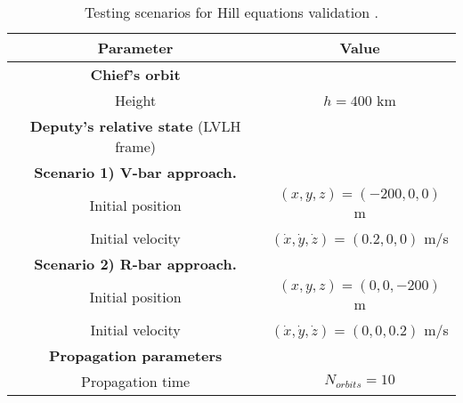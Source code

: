 \begin{table}[!htb]
\begin{center}
\begin{tabular}{|c|c|}
\hline 
\hline
\rowcolor{Gray!30}
\textbf{Parameter} & \textbf{Value} \\
\hline 
\hline 
\rowcolor{Gray!10} \textbf{Chief's orbit} &   \\
\hline
 Height & $h = 400$ km \\
\hline 
\rowcolor{Gray!10}\textbf{Deputy's relative state} (LVLH frame) &   \\
\hline
\textbf{Scenario 1) V-bar approach. } &   \\
 Initial position & $( x, y, z) = (-200, 0, 0)$ m \\
 Initial velocity & $(  \dot{x}, \dot{y}, \dot{z})= (0.2, 0, 0)$ m/s \\  
\hline 
\textbf{Scenario 2) R-bar approach. } &   \\
 Initial position & $( x, y, z) = (0, 0, -200)$ m \\
 Initial velocity & $(  \dot{x}, \dot{y}, \dot{z})= (0, 0, 0.2)$ m/s \\  
\hline 
\rowcolor{Gray!10}\textbf{Propagation parameters} &  \\
\hline 
 Propagation time & $N_{orbits} = 10$  \\
\hline 
\end{tabular} 
\end{center}
\caption{Testing scenarios for Hill equations validation \cite{Wakker}.}
\label{tabCh2:Scenarios_Wakker}
\end{table}
%
\FloatBarrier
%
